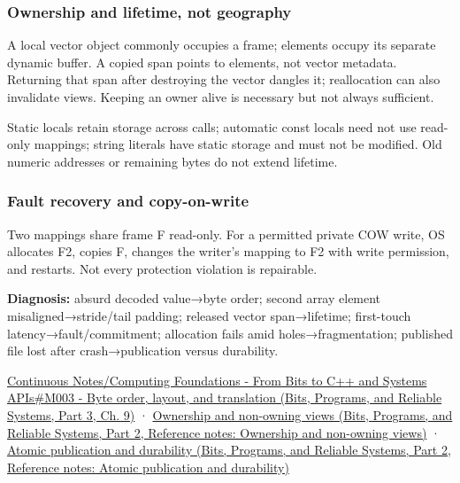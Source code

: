 \subsubsection{Ownership and lifetime, not geography}\label{appendix-92ff77d4dfdc-ownership-and-lifetime-not-geography}

\hypertarget{appendix-92ff77d4dfdc-ownership-and-lifetime-not-geography}{}

A local vector object commonly occupies a frame; elements occupy its separate dynamic buffer. A copied span points to elements, not vector metadata. Returning that span after destroying the vector dangles it; reallocation can also invalidate views. Keeping an owner alive is necessary but not always sufficient.

Static locals retain storage across calls; automatic const locals need not use read-only mappings; string literals have static storage and must not be modified. Old numeric addresses or remaining bytes do not extend lifetime.

\subsubsection{Fault recovery and copy-on-write}\label{appendix-92ff77d4dfdc-fault-recovery-and-copy-on-write}

\hypertarget{appendix-92ff77d4dfdc-fault-recovery-and-copy-on-write}{}

Two mappings share frame F read-only. For a permitted private COW write, OS allocates F2, copies F, changes the writer's mapping to F2 with write permission, and restarts. Not every protection violation is repairable.

\textbf{Diagnosis:} absurd decoded value→byte order; second array element misaligned→stride/tail padding; released vector span→lifetime; first-touch latency→fault/commitment; allocation fails amid holes→fragmentation; published file lost after crash→publication versus durability.

\href{../01-Bits-Programs-and-Reliable-Systems-P03/main.pdf\#nameddest=01-foundations-i-ch011-m003---byte-order-layout-and-translation}{Continuous Notes/Computing Foundations - From Bits to C++ and Systems APIs\#M003 - Byte order, layout, and translation (Bits, Programs, and Reliable Systems, Part 3, Ch. 9)} · \href{../01-Bits-Programs-and-Reliable-Systems-P02/main.pdf\#nameddest=appendix-d52e4486f527}{Ownership and non-owning views (Bits, Programs, and Reliable Systems, Part 2, Reference notes: Ownership and non-owning views)} · \href{../01-Bits-Programs-and-Reliable-Systems-P02/main.pdf\#nameddest=appendix-e89a8f290ef5}{Atomic publication and durability (Bits, Programs, and Reliable Systems, Part 2, Reference notes: Atomic publication and durability)}

